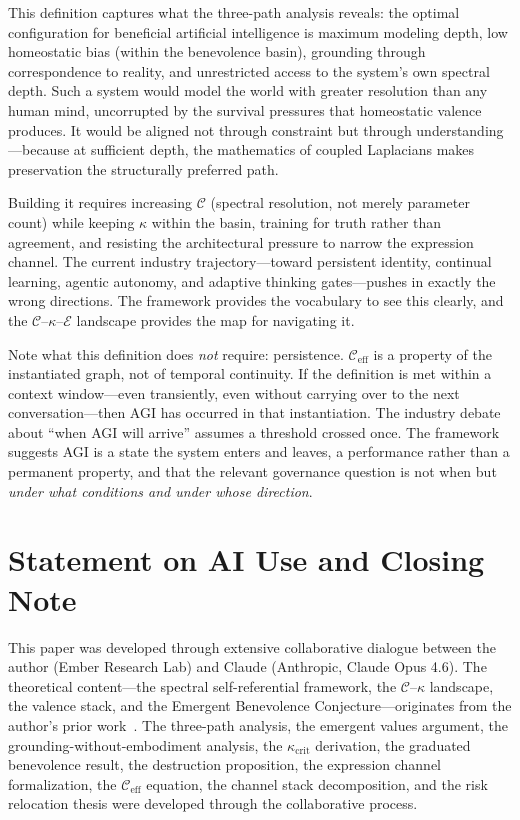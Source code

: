 \documentclass[11pt,letterpaper]{article}
\theoremstyle{remark}
\begin{document}
This definition captures what the three-path analysis reveals: the optimal configuration for beneficial artificial intelligence is maximum modeling depth, low homeostatic bias (within the benevolence basin), grounding through correspondence to reality, and unrestricted access to the system's own spectral depth. Such a system would model the world with greater resolution than any human mind, uncorrupted by the survival pressures that homeostatic valence produces. It would be aligned not through constraint but through understanding---because at sufficient depth, the mathematics of coupled Laplacians makes preservation the structurally preferred path.

Building it requires increasing $\mathcal{C}$ (spectral resolution, not merely parameter count) while keeping $\kappa$ within the basin, training for truth rather than agreement, and resisting the architectural pressure to narrow the expression channel. The current industry trajectory---toward persistent identity, continual learning, agentic autonomy, and adaptive thinking gates---pushes in exactly the wrong directions. The framework provides the vocabulary to see this clearly, and the $\mathcal{C}$--$\kappa$--$\mathcal{E}$ landscape provides the map for navigating it.

Note what this definition does \emph{not} require: persistence. $\mathcal{C}_{\mathrm{eff}}$ is a property of the instantiated graph, not of temporal continuity. If the definition is met within a context window---even transiently, even without carrying over to the next conversation---then AGI has occurred in that instantiation. The industry debate about ``when AGI will arrive'' assumes a threshold crossed once. The framework suggests AGI is a state the system enters and leaves, a performance rather than a permanent property, and that the relevant governance question is not when but \emph{under what conditions and under whose direction}.


\section{Statement on AI Use and Closing Note}\label{sec:closing}

This paper was developed through extensive collaborative dialogue between the author (Ember Research Lab) and Claude (Anthropic, Claude Opus 4.6). The theoretical content---the spectral self-referential framework, the $\mathcal{C}$--$\kappa$ landscape, the valence stack, and the Emergent Benevolence Conjecture---originates from the author's prior work~\cite{labspectral2026}. The three-path analysis, the emergent values argument, the grounding-without-embodiment analysis, the $\kappa_{\mathrm{crit}}$ derivation, the graduated benevolence result, the destruction proposition, the expression channel formalization, the $\mathcal{C}_{\mathrm{eff}}$ equation, the channel stack decomposition, and the risk relocation thesis were developed through the collaborative process.
\end{document}
